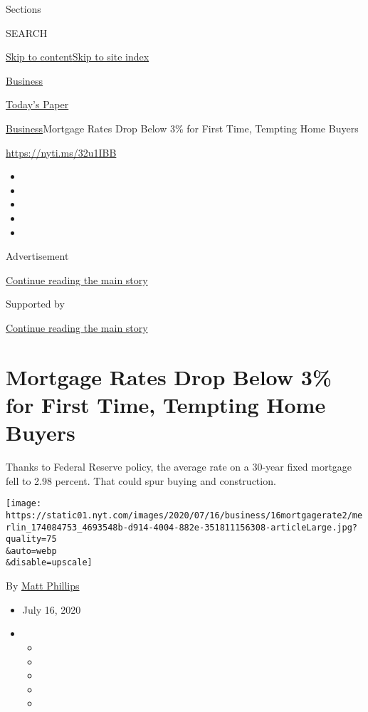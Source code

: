 Sections

SEARCH

\protect\hyperlink{site-content}{Skip to
content}\protect\hyperlink{site-index}{Skip to site index}

\href{https://www.nytimes.com/section/business}{Business}

\href{https://myaccount.nytimes.com/auth/login?response_type=cookie\&client_id=vi}{}

\href{https://www.nytimes.com/section/todayspaper}{Today's Paper}

\href{/section/business}{Business}\textbar{}Mortgage Rates Drop Below
3\% for First Time, Tempting Home Buyers

\url{https://nyti.ms/32u1IBB}

\begin{itemize}
\item
\item
\item
\item
\item
\end{itemize}

Advertisement

\protect\hyperlink{after-top}{Continue reading the main story}

Supported by

\protect\hyperlink{after-sponsor}{Continue reading the main story}

\hypertarget{mortgage-rates-drop-below-3-for-first-time-tempting-home-buyers}{%
\section{Mortgage Rates Drop Below 3\% for First Time, Tempting Home
Buyers}\label{mortgage-rates-drop-below-3-for-first-time-tempting-home-buyers}}

Thanks to Federal Reserve policy, the average rate on a 30-year fixed
mortgage fell to 2.98 percent. That could spur buying and construction.

\texttt{[image: https://static01.nyt.com/images/2020/07/16/business/16mortgagerate2/merlin\_174084753\_4693548b-d914-4004-882e-351811156308-articleLarge.jpg?quality=75\\\&auto=webp\\\&disable=upscale]}

By \href{https://www.nytimes.com/by/matt-phillips}{Matt Phillips}

\begin{itemize}
\item
  July 16, 2020
\item
  \begin{itemize}
  \item
  \item
  \item
  \item
  \item
  \end{itemize}
\end{itemize}

